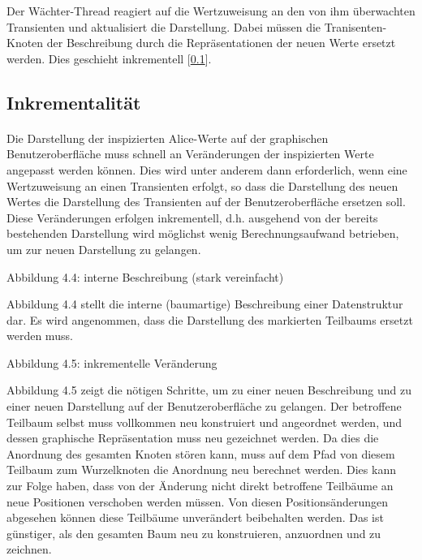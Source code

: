 \documentclass[12pt,a4paper]{article}
\begin{document}
Der W\"achter-Thread reagiert auf die Wertzuweisung 
an den von ihm \"uberwachten Transienten und aktualisiert 
die Darstellung. Dabei m\"ussen die Tranisenten-Knoten 
der Beschreibung durch die Repr\"asentationen der neuen 
Werte ersetzt werden. Dies geschieht inkrementell [\ref{inkr}].


\subsection{Inkrementalit\"at}

\label{inkr} 

\paragraph{}

Die Darstellung der inspizierten Alice-Werte auf 
der graphischen Benutzeroberfl\"ache muss 
schnell an Ver\"anderungen der inspizierten 
Werte angepasst werden k\"onnen. Dies 
wird unter anderem dann erforderlich, wenn 
eine Wertzuweisung an einen Transienten 
erfolgt, so dass die Darstellung des 
neuen Wertes die Darstellung des Transienten 
auf der Benutzeroberfl\"ache ersetzen soll. 
Diese Ver\"anderungen erfolgen inkrementell, 
d.h. ausgehend von der bereits bestehenden 
Darstellung wird m\"oglichst wenig Berechnungsaufwand 
betrieben, um zur neuen Darstellung zu gelangen.

\begin{center}
\newline Abbildung 4.4: interne Beschreibung (stark vereinfacht)
\end{center} 

Abbildung 4.4 stellt die interne (baumartige) Beschreibung einer 
Datenstruktur dar. Es wird angenommen, dass die Darstellung 
des markierten Teilbaums ersetzt werden muss.

\begin{center}
\newline Abbildung 4.5: inkrementelle Ver\"anderung 
\end{center}

Abbildung 4.5 zeigt die n\"otigen Schritte, um zu einer 
neuen Beschreibung und zu einer neuen Darstellung 
auf der Benutzeroberfl\"ache zu gelangen. 
Der betroffene Teilbaum selbst muss vollkommen neu konstruiert 
und angeordnet werden, und dessen graphische Repr\"asentation 
muss neu gezeichnet werden. Da dies die Anordnung des 
gesamten Knoten st\"oren kann, muss auf dem Pfad von 
diesem Teilbaum zum Wurzelknoten die Anordnung neu berechnet werden. 
Dies kann zur Folge haben, dass von der \"Anderung nicht direkt 
betroffene Teilb\"aume an neue Positionen verschoben 
werden m\"ussen. Von diesen Positions\"{a}nderungen 
abgesehen k\"onnen diese Teilb\"aume unver\"andert 
beibehalten werden. Das ist g\"unstiger, als den gesamten 
Baum neu zu konstruieren, anzuordnen und zu zeichnen.   
 
\end{document}

